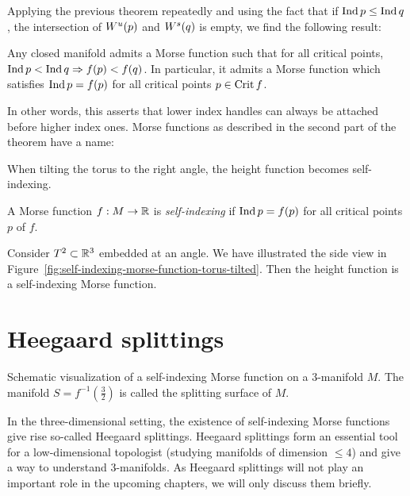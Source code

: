 Applying the previous theorem repeatedly and using the fact that if $\operatorname{Ind} p \le  \operatorname{Ind} q$, the intersection of $W^u(p)$ and  $W^s(q)$ is empty, we find the following result:

\begin{theorem}
    Any closed manifold admits a Morse function such that for all critical points, $\operatorname{Ind} p < \operatorname{Ind} q \Rightarrow f(p) < f(q)$.
    In particular, it admits a Morse function which satisfies $ \operatorname{Ind} p  = f(p) $ for all critical points $p \in \operatorname{Crit} f$.
\end{theorem}
In other words, this asserts that lower index handles can always be attached before higher index ones.
Morse functions as described in the second part of the theorem have a name:
\begin{marginfigure}
    \centering
    \caption{When tilting the torus to the right angle, the height function becomes self-indexing.}
    \label{fig:self-indexing-morse-function-torus-tilted}
\end{marginfigure}
\begin{definition}
    A Morse function $f: M \to  \mathbb{R}$ is \emph{self-indexing} if $\operatorname{Ind} p = f(p)$ for all critical points  $p$ of  $f$.
\end{definition}
\begin{eg}
    Consider $T^2 \subset \mathbb{R}^3$ embedded at an angle. We have illustrated the side view in Figure~\ref{fig:self-indexing-morse-function-torus-tilted}.
    Then the height function is a self-indexing Morse function.
\end{eg}

\section{Heegaard splittings}
\begin{marginfigure}
    \centering
    \caption{Schematic visualization of a self-indexing Morse function on a $3$-manifold $M$.
        The manifold $S = f^{-1}(\frac{3}{2})$ is called the splitting surface of $M$.
    }
    \label{fig:heegaard-splittings-schemattically}
\end{marginfigure}
In the three-dimensional setting, the existence of self-indexing Morse functions give rise so-called Heegaard splittings.
Heegaard splittings form an essential tool for a low-dimensional topologist (studying manifolds of dimension $\le 4$) and give a way to understand $3$-manifolds.
As Heegaard splittings will not play an important role in the upcoming chapters, we will only discuss them briefly.



